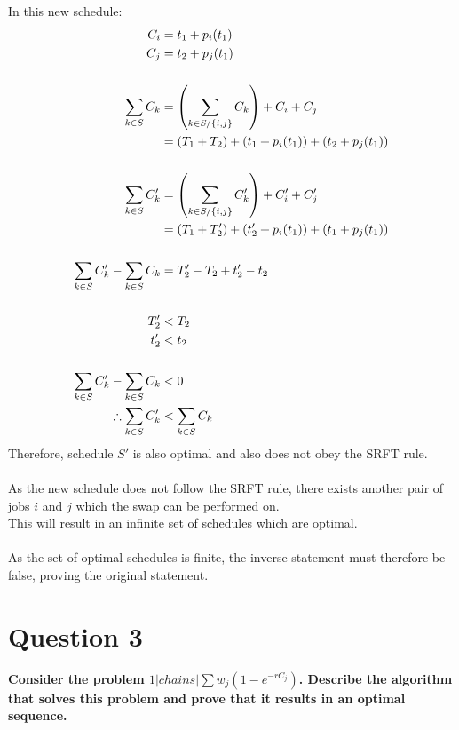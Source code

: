 \documentclass[a4paper, fleqn]{article}
\begin{document}
In this new schedule:
$$
\begin{aligned}
C_i&=t_1+p_i(t_1)\\
C_j&=t_2+p_j(t_1)\\
\vspace{1pt}\\
\sum_{k\in S} C_k&=\left(\sum_{k\in S/\{i,j\}}C_k\right)+C_i+C_j\\
&=(T_1+T_2)+(t_1+p_i(t_1))+(t_2+p_j(t_1))\\
\vspace{1pt}\\
\sum_{k\in S} C_k'&=\left(\sum_{k\in S/\{i,j\}}C_k'\right)+C_i'+C_j'\\
&=(T_1+T_2')+(t_2'+p_i(t_1))+(t_1+p_j(t_1))\\
\vspace{1pt}\\
\sum_{k\in S} C_k'-\sum_{k\in S} C_k&=T_2'-T_2+t_2'-t_2\\
\vspace{1pt}\\
T_2'&<T_2\\
t_2'&<t_2\\
\vspace{1pt}\\
\sum_{k\in S} C_k'-\sum_{k\in S} C_k &<0\\
\therefore \sum_{k\in S} C_k'&<\sum_{k\in S} C_k
\end{aligned}
$$
Therefore, schedule $S'$ is also optimal and also does not obey the SRFT rule.\\
\vspace{1pt}\\
As the new schedule does not follow the SRFT rule, there exists another pair of jobs $i$ and $j$ which the swap can be performed on.\\
This will result in an infinite set of schedules which are optimal.\\
\vspace{1pt}\\
As the set of optimal schedules is finite, the inverse statement must therefore be false, proving the original statement.
\pagebreak

\section{Question 3}
\textbf{Consider the problem $1|chains|\sum w_j(1-e^{-rC_j})$. Describe the algorithm that solves this problem and prove that it results in an optimal sequence.}\\
\end{document}
